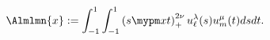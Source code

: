 \documentclass[a4paper]{article}
\begin{document}
\begin{theorem}
  \label{main-thm}
  \begin{equation*}
	\Almlmn{x}\assign
     \displaystyle
     \int_{- 1}^1 \displaystyle\int_{- 1}^1 \mybra{ s\mypm xt }_+^{2 \nu} u_{\ell}^{\lambda} (s)
     u_m^{\mu} (t) d s d t.
  \end{equation*}
\end{theorem}















\end{document}
